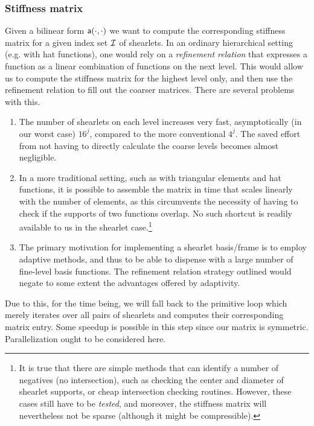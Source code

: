 \subsubsection{Stiffness matrix}

Given a bilinear form ${\sf a}(\cdot,\cdot)$ we want to compute the corresponding stiffness matrix for a given
index set $\mathcal{I}$ of shearlets. In an ordinary hierarchical setting (e.g. with hat functions), one would rely on
a {\em refinement relation} that expresses a function as a linear combination of functions on the next level.
This would allow us to compute the stiffness matrix for the highest level only, and then use the refinement
relation to fill out the coarser matrices. There are several problems with this.

\begin{enumerate}
\item The number of shearlets on each level increases very fast, asymptotically (in our worst case) $16^j$,
compared to the more conventional $4^j$. The saved effort from not having to directly calculate the coarse
levels becomes almost negligible.

\item In a more traditional setting, such as with triangular elements and hat functions, it is possible to
assemble the matrix in time that scales linearly with the number of elements, as this circumvents the
necessity of having to check if the supports of two functions overlap. No such shortcut is readily available
to us in the shearlet case.\footnote{It is true that there are simple methods that can identify a number of
negatives (no intersection), such as checking the center and diameter of shearlet supports, or cheap
intersection checking routines. However, these cases still have to be {\em tested}, and moreover, the
stiffness matrix will nevertheless not be sparse (although it might be compressible).}

\item The primary motivation for implementing a shearlet basis/frame is to employ adaptive methods, and thus
to be able to dispense with a large number of fine-level basis functions. The refinement relation strategy
outlined would negate to some extent the advantages offered by adaptivity.
\end{enumerate}

Due to this, for the time being, we will fall back to the primitive loop which merely iterates over all pairs
of shearlets and computes their corresponding matrix entry. Some speedup is possible in this step since our
matrix is symmetric. Parallelization ought to be considered here.

